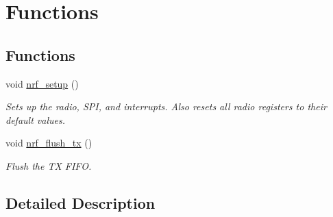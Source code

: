 \hypertarget{group___user}{}\section{Functions}
\label{group___user}
\subsection*{Functions}
\begin{DoxyCompactItemize}
\item 
void \hyperlink{group___user_gaf022f4a6e0c8d5bfee1f88bc868759d6}{nrf\+\_\+setup} ()\hypertarget{group___user_gaf022f4a6e0c8d5bfee1f88bc868759d6}{}\label{group___user_gaf022f4a6e0c8d5bfee1f88bc868759d6}

\begin{DoxyCompactList}\small\item\em Sets up the radio, S\+PI, and interrupts. Also resets all radio registers to their default values. \end{DoxyCompactList}\item 
void \hyperlink{group___user_ga0dbdc466783e7a7463a5b062c5153845}{nrf\+\_\+flush\+\_\+tx} ()\hypertarget{group___user_ga0dbdc466783e7a7463a5b062c5153845}{}\label{group___user_ga0dbdc466783e7a7463a5b062c5153845}

\begin{DoxyCompactList}\small\item\em Flush the TX F\+I\+FO. \end{DoxyCompactList}\end{DoxyCompactItemize}


\subsection{Detailed Description}
